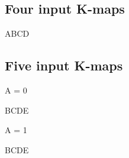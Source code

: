 \documentclass{article}
\begin{document}
\subsection{Four input K-maps}
\begin{Karnaugh}{AB}{CD}
\end{Karnaugh}

\subsection{Five input K-maps}

A = 0
\begin{Karnaugh}{BC}{DE}
\end{Karnaugh} \hfill
A = 1
\begin{Karnaugh}{BC}{DE}
\end{Karnaugh}

%
%
\end{document}
